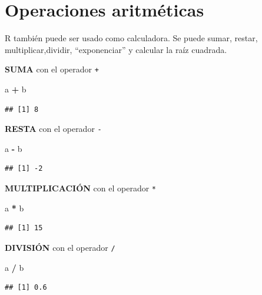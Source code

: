 \documentclass[
]{book}
\newenvironment{Shaded}{\begin{snugshade}}{\end{snugshade}}
\newcommand{\NormalTok}[1]{#1}
\newcommand{\SpecialCharTok}[1]{\textcolor[rgb]{0.81,0.36,0.00}{\textbf{#1}}}
\begin{document}
\section{Operaciones aritméticas}\label{operaciones-aritmuxe9ticas}

R también puede ser usado como calculadora.
Se puede sumar, restar, multiplicar,dividir, ``exponenciar'' y calcular la raíz cuadrada.

\textbf{SUMA} con el operador \texttt{+}

\begin{Shaded}
\begin{Highlighting}[]
\NormalTok{a }\SpecialCharTok{+}\NormalTok{ b}
\end{Highlighting}
\end{Shaded}

\begin{verbatim}
## [1] 8
\end{verbatim}

\textbf{RESTA} con el operador \texttt{-}

\begin{Shaded}
\begin{Highlighting}[]
\NormalTok{a }\SpecialCharTok{{-}}\NormalTok{ b}
\end{Highlighting}
\end{Shaded}

\begin{verbatim}
## [1] -2
\end{verbatim}

\textbf{MULTIPLICACIÓN} con el operador \texttt{*}

\begin{Shaded}
\begin{Highlighting}[]
\NormalTok{a }\SpecialCharTok{*}\NormalTok{ b}
\end{Highlighting}
\end{Shaded}

\begin{verbatim}
## [1] 15
\end{verbatim}

\textbf{DIVISIÓN} con el operador \texttt{/}

\begin{Shaded}
\begin{Highlighting}[]
\NormalTok{a }\SpecialCharTok{/}\NormalTok{ b}
\end{Highlighting}
\end{Shaded}

\begin{verbatim}
## [1] 0.6
\end{verbatim}
\end{document}
